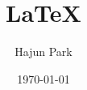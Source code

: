 %
%
%

\usepackage{currfile} %
\usepackage{hyperref} %
\usepackage{listings} %
\usepackage{minted} %
\usepackage[
  skip=\baselineskip, %
  indent=0pt %
]{parskip}
\usepackage{subfiles} %
\usepackage{verbatim} %


\title{\LaTeX}
\author{Hajun Park}
\date{\today}
